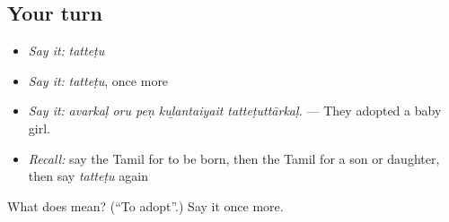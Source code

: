 \subsection*{Your turn}
\begin{itemize}
\raggedright
  \item \emph{Say it:} \emph{tatteṭu}
  \item \emph{Say it:} \emph{tatteṭu}, once more
  \item \emph{Say it:} \emph{avarkaḷ oru peṇ kuḻantaiyait tatteṭuttārkaḷ.} — They adopted a baby girl.
  \item \emph{Recall:} say the Tamil for to be born, then the Tamil for a son or daughter, then say \emph{tatteṭu} again
\end{itemize}

\begin{tcolorbox}[breakable,colback=teal!4,colframe=teal!35!black,title={Before you move on}]
What does  mean? (\textquotedblleft{}To adopt\textquotedblright{}.) Say it once more.
\end{tcolorbox}
